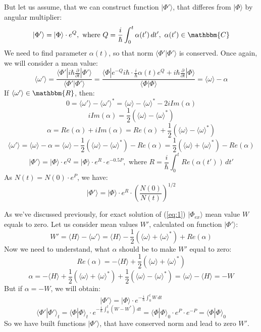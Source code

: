 But let us assume, that we can construct function $|\Phi'\rangle$, that differes from $|\Phi\rangle$ by angular multiplier:
$$|\Phi'\rangle = |\Phi\rangle\cdot e^Q,\text{ where } Q = \frac{i}{\hbar}\int_0^t\alpha(t')\,dt',\ \alpha(t')\in\mathbbm{C}$$
We need to find parameter $\alpha(t)$, so that norm $\langle\Phi'|\Phi'\rangle$ is conserved. Once again, we will consider a mean value:
$$\langle\omega'\rangle = \frac{\langle\Phi'|i\hbar\frac{\partial}{\partial t}|\Phi'\rangle}{\langle\Phi'|\Phi'\rangle} = %
			  \frac{\langle\Phi|e^{-Q} i\hbar \cdot \frac{i}{\hbar} \alpha(t) e^Q + %
			   i\hbar\frac{\partial}{\partial t}|\Phi\rangle}{\langle\Phi|\Phi\rangle}=\langle\omega\rangle - \alpha$$
If $\langle\omega'\rangle\in\mathbbm{R}$, then:
$$0 = \langle\omega'\rangle-\langle\omega'\rangle^* = \langle\omega\rangle - \langle\omega\rangle^* - 2i\mathit{Im}( \alpha )$$
$$i\mathit{Im}( \alpha ) = \frac{1}{2}\left( \langle\omega\rangle - \langle\omega\rangle^*\right)$$
$$\alpha = \mathit{Re}( \alpha ) + i\mathit{Im}( \alpha ) = %
	   \mathit{Re}( \alpha ) + \frac{1}{2}\left( \langle\omega\rangle - \langle\omega\rangle^*\right)$$
$$\langle\omega'\rangle = \langle\omega\rangle - \alpha = %
			  \langle\omega\rangle - \frac{1}{2}\left(\langle\omega\rangle - %
								  \langle\omega\rangle^*\right) - \mathit{Re}( \alpha ) = %
			  \frac{1}{2}\left(\langle\omega\rangle + \langle\omega\rangle^*\right) - \mathit{Re}( \alpha )$$
$$|\Phi'\rangle = |\Phi\rangle\cdot e^Q = |\Phi\rangle\cdot e^R\cdot e^{-0.5P},%
					      \text{ where } R = \frac{i}{\hbar}\int_0^t\mathit{Re}(\alpha(t'))\,dt'$$
As $N(t) = N(0)\cdot e^P $, we have:
$$|\Phi'\rangle = |\Phi\rangle\cdot e^R\cdot\left(\frac{N(0)}{N(t)}\right)^{1/2}$$

As we've discussed previously, for exact solution of (\ref{eq:1}) $|\Phi_{ex}\rangle$ mean value $W$ equals to zero.
 Let us consider mean values $W'$, calculated on function $|\Phi'\rangle$:
$$W' = \langle H\rangle - \langle\omega'\rangle = %
		      \langle H\rangle - \frac{1}{2}\left(\langle\omega\rangle+\langle\omega\rangle^*\right)+\mathit{Re}(\alpha)$$
Now we need to understand, what $\alpha$ should be to make $W'$ equal to zero:
$$\mathit{Re}(\alpha) = -\langle H\rangle + \frac{1}{2}\left(\langle\omega\rangle+\langle\omega\rangle^*\right)$$
$$\alpha = -\langle H\rangle + \frac{1}{2}\left(\langle\omega\rangle+\langle\omega\rangle^*\right) +%
			      \frac{1}{2}\left(\langle\omega\rangle-\langle\omega\rangle^*\right)=%
	    \langle\omega\rangle - \langle H\rangle = -W$$
But if $\alpha = -W$, we will obtain:
$$|\Phi'\rangle = |\Phi\rangle\cdot e^{ -\frac{i}{\hbar}\int_0^t W\,dt}$$
$$\langle\Phi'|\Phi'\rangle_t = \langle\Phi|\Phi\rangle_t\cdot e^{ -\frac{i}{\hbar}\int_0^t(W-W^*)\,dt} = %
				\langle\Phi|\Phi\rangle_0\cdot e^P\cdot e^{-P} = \langle\Phi|\Phi\rangle_0$$
So we have built functions $|\Phi'\rangle$, that have conserved norm and lead to zero $W'$. 

